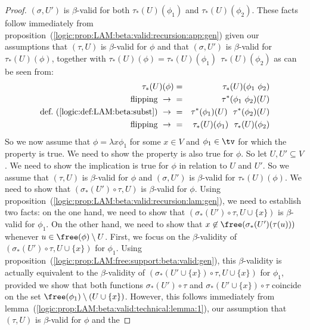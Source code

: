 \begin{proof}
    $(\sigma,U')$ is $\beta$-valid for both $\tau_{*}(U)(\phi_{1})$
    and $\tau_{*}(U)(\phi_{2})$. These facts follow immediately from 
    proposition~(\ref{logic:prop:LAM:beta:valid:recursion:app:gen}) 
    given our assumptions that $(\tau,U)$ is $\beta$-valid for $\phi$
    and that $(\sigma,U')$ is $\beta$-valid for $\tau_{*}(U)(\phi)$,
    together with $\tau_{*}(U)(\phi)=\tau_{*}(U)(\phi_{1})\ \ \tau_{*}(U)
    (\phi_{2})$ as can be seen from:
        \begin{eqnarray*}\tau_{*}(U)(\phi)
            &=&\tau_{*}(U)(\phi_{1}\ \phi_{2})\\
            \mbox{flipping}\ \to\ 
            &=&\tau^{*}(\phi_{1}\ \phi_{2})(U)\\
            \mbox{def.~(\ref{logic:def:LAM:beta:subst})}\ \to\ 
            &=&\tau^{*}(\phi_{1})(U)\ \ \tau^{*}(\phi_{2})(U)\\
            \mbox{flipping}\ \to\ 
            &=&\tau_{*}(U)(\phi_{1})\ \ \tau_{*}(U)(\phi_{2})\\
        \end{eqnarray*}
    So we now assume that $\phi=\lambda x\phi_{1}$ for some $x\in V$ and
    $\phi_{1}\in\tv$ for which the property is true. We need to show the
    property is also true for $\phi$. So let $U,U'\subseteq V$. We need to show
    the implication is true for $\phi$ in relation to $U$ and $U'$. So we
    assume that $(\tau,U)$ is $\beta$-valid for $\phi$ and $(\sigma,U')$ is
    $\beta$-valid for $\tau_{*}(U)(\phi)$. We need to show that $(\sigma_{*}
    (U')\circ\tau,U)$ is $\beta$-valid for $\phi$. Using
    proposition~(\ref{logic:prop:LAM:beta:valid:recursion:lam:gen}), we
    need to establish two facts: on the one hand, we need to show that
    $(\sigma_{*}(U')\circ\tau,U\cup\{x\})$ is $\beta$-valid for $\phi_{1}$.
    On the other hand, we need to show that $x\not\in\free(\sigma_{*}(U')(\tau
    (u)))$ whenever $u\in\free(\phi)\setminus U$. First, we focus on the
    $\beta$-validity of $(\sigma_{*}(U')\circ\tau,U\cup\{x\})$ for $\phi_{1}$.
    Using proposition~(\ref{logic:prop:LAM:free:support:beta:valid:gen}), 
    this $\beta$-validity is actually equivalent to the $\beta$-validity
    of $(\sigma_{*}(U'\cup\{x\})\circ\tau,U\cup\{x\})$ for $\phi_{1}$,
    provided we show that both functions $\sigma_{*}(U')\circ\tau$
    and $\sigma_{*}(U'\cup\{x\})\circ\tau$ coincide on the set
    $\free(\phi_{1})\setminus(U\cup\{x\})$. However, this follows
    immediately from lemma~(\ref{logic:prop:LAM:beta:valid:technical:lemma:1}),
    our assumption that $(\tau,U)$ is $\beta$-valid for $\phi$ and the

\end{proof}
